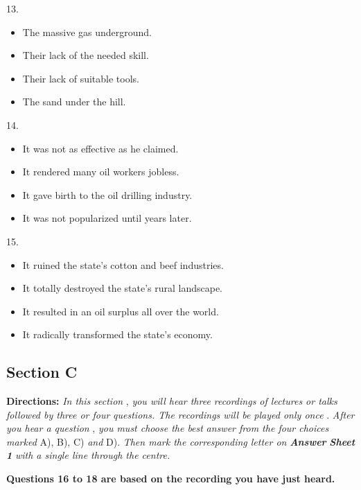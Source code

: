 \documentclass[UTF8,11pt]{ctexart}
\begin{document}
13.


\begin{itemize}[leftmargin=2em,itemsep=.2em,topsep=.4em]\item[A.] The massive gas underground.
\item[B.] Their lack of the needed skill.
\item[C.] Their lack of suitable tools.
\item[D.] The sand under the hill.
\end{itemize}

14.


\begin{itemize}[leftmargin=2em,itemsep=.2em,topsep=.4em]\item[A.] It was not as effective as he claimed.
\item[B.] It rendered many oil workers jobless.
\item[C.] It gave birth to the oil drilling industry.
\item[D.] It was not popularized until years later.
\end{itemize}

15.


\begin{itemize}[leftmargin=2em,itemsep=.2em,topsep=.4em]\item[A.] It ruined the state's cotton and beef industries.
\item[B.] It totally destroyed the state's rural landscape.
\item[C.] It resulted in an oil surplus all over the world.
\item[D.] It radically transformed the state's economy.
\end{itemize}

\subsection*{\textbf{Section C}}


\textbf{Directions: }\textit{In this section }, \textit{you will hear three recordings of lectures or talks followed by three or four} \textit{questions. The recordings will be played only once }. \textit{After you hear a question }, \textit{you must choose the best} \textit{answer from the four choices marked }A), B), C) \textit{and }D). \textit{Then mark the corresponding letter on }\textbf{\textit{Answer}} \textbf{\textit{Sheet 1 }}\textit{with a single line through the centre.}


\textbf{Questions 16 to 18 are based on the recording you have just heard.}
\end{document}
